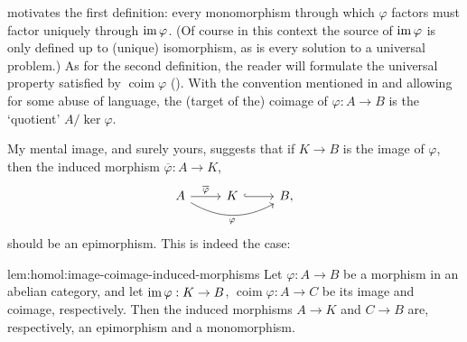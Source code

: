  motivates the first definition: every
monomorphism through which $\varphi$ factors must factor uniquely
through $\operatorname{im}\varphi$. (Of course in this context the source of
$\operatorname{im}\varphi$ is only defined up to (unique) isomorphism, as is
every solution to a universal problem.) As for the second definition,
the reader will formulate the universal property satisfied by
$\operatorname{coim}\varphi$
(). With the convention
mentioned in  and allowing for some abuse of language,
the (target of the) coimage of $\varphi : A \to B$ is the `quotient'
$A/\ker\varphi$.

My mental image, and surely yours, suggests that if $K \to B$ is the
image of $\varphi$, then the induced morphism
$\overline{\varphi} : A \to K$,
\[\begin{tikzcd}
    A \arrow[r, "\overline{\varphi}"] \arrow[rr, bend right,
    "\varphi"'] & K \arrow[r, hook] & B,
  \end{tikzcd}\] should be an epimorphism. This is indeed the case:
\begin{lem}{}{lem:homol:image-coimage-induced-morphisms}
  Let $\varphi : A \to B$ be a morphism in an abelian category, and
  let $\operatorname{im}\varphi : K \to B$,
  $\operatorname{coim}\varphi : A \to C$ be its image and coimage,
  respectively. Then the induced morphisms $A \to K$ and $C \to B$
  are, respectively, an epimorphism and a monomorphism.
\end{lem}

